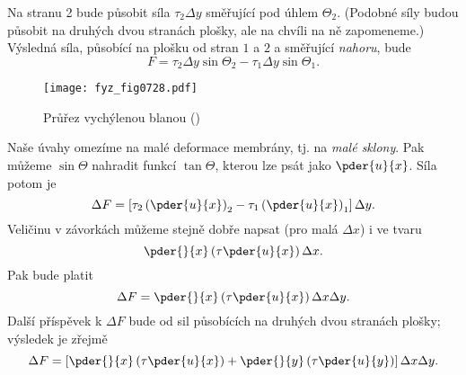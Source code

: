     Na stranu 2 bude působit síla \(\tau_2\Delta y\)  směřující pod úhlem \(\Theta_2\). (Podobné
    síly budou působit na druhých dvou stranách plošky, ale na chvíli na ně zapomeneme.) Výsledná
    síla, působící na plošku od stran \(1\) a \(2\) a směřující \emph{nahoru}, bude
    \begin{equation*}
      F = \tau_2\Delta y \sin\Theta_2 - \tau_1\Delta y \sin\Theta_1.
    \end{equation*}

    \begin{figure}[ht!] %
      \centering
      \texttt{[image: fyz\_fig0728.pdf]}
      \caption{Průřez vychýlenou blanou (\cite[s.~707]{Feynman02})}
      \label{fyz:fig0728}
    \end{figure}

    Naše úvahy omezíme na malé deformace membrány, tj. na \emph{malé sklony}. Pak můžeme
    \(\sin\Theta\) nahradit funkcí \(\tan\Theta\), kterou lze psát jako \(\pder{u}{x}\). Síla
    potom je
    \begin{equation*}
      \Delta F = \left[
          \tau_2\left(\pder{u}{x}\right)_2 - 
          \tau_1\left(\pder{u}{x}\right)_1
        \right]\Delta y.
    \end{equation*}
    Veličinu v závorkách můžeme stejně dobře napsat (pro malá \(\Delta x\)) i ve tvaru
    \begin{equation*}
      \pder{}{x}\left(\tau\pder{u}{x}\right)\Delta x.
    \end{equation*}
    Pak bude platit
    \begin{equation*}
      \Delta F = \pder{}{x}\left(\tau\pder{u}{x}\right)\Delta x\Delta y.
    \end{equation*}
    Další příspěvek k \(\Delta F\) bude od sil působících na druhých dvou stranách plošky; výsledek
    je zřejmě
    \begin{equation}\label{fyz:eq772}
      \Delta F = \left[
          \pder{}{x}\left(\tau\pder{u}{x}\right) + 
          \pder{}{y}\left(\tau\pder{u}{y}\right)
        \right]\Delta x\Delta y.
    \end{equation}

